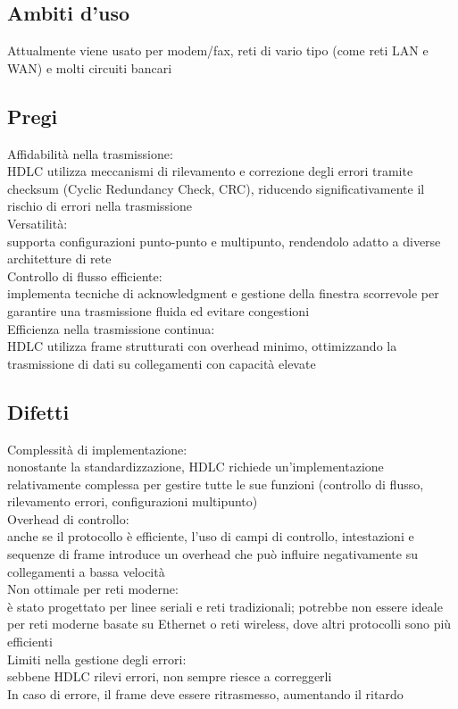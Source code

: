\documentclass[10pt,oneside,a4paper]{article}
\begin{document}
\subsection{Ambiti d'uso}
Attualmente viene usato per modem/fax, reti di vario tipo (come reti LAN  e WAN) e molti circuiti bancari
\subsection{Pregi}
Affidabilità nella trasmissione:\\
HDLC utilizza meccanismi di rilevamento e correzione degli errori tramite checksum (Cyclic Redundancy Check, CRC), riducendo significativamente il rischio di errori nella trasmissione\\
Versatilità:\\
supporta configurazioni punto-punto e multipunto, rendendolo adatto a diverse architetture di rete\\
Controllo di flusso efficiente:\\
implementa tecniche di acknowledgment e gestione della finestra scorrevole per garantire una trasmissione fluida ed evitare congestioni\\
Efficienza nella trasmissione continua:\\
HDLC utilizza frame strutturati con overhead minimo, ottimizzando la trasmissione di dati su collegamenti con capacità elevate
\subsection{Difetti}
Complessità di implementazione:\\
nonostante la standardizzazione, HDLC richiede un'implementazione relativamente complessa per gestire tutte le sue funzioni (controllo di flusso, rilevamento errori, configurazioni multipunto)\\
Overhead di controllo:\\
anche se il protocollo è efficiente, l'uso di campi di controllo, intestazioni e sequenze di frame introduce un overhead che può influire negativamente su collegamenti a bassa velocità\\
Non ottimale per reti moderne:\\
è stato progettato per linee seriali e reti tradizionali; potrebbe non essere ideale per reti moderne basate su Ethernet o reti wireless, dove altri protocolli sono più efficienti\\
Limiti nella gestione degli errori:\\
sebbene HDLC rilevi errori, non sempre riesce a correggerli\\
In caso di errore, il frame deve essere ritrasmesso, aumentando il ritardo
\end{document}
